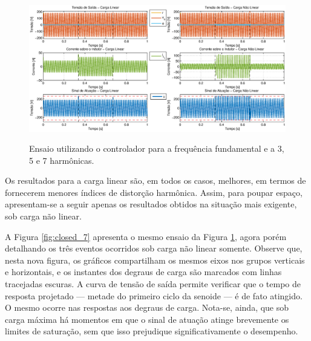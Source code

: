 \documentclass[repeatfields,oneside]{tcc}
\begin{document}
\begin{figure}[h]
    \centering
    \caption{Ensaio utilizando o controlador para a frequência fundamental e a 3{\textordfeminine}, 5{\textordfeminine} e 7{\textordfeminine} harmônicas.}
    \includegraphics[trim={80 20 80 20}, clip, width=\linewidth]{fig/closed_7_full.eps}
    \\
    \label{fig:closed_7_full}
\end{figure}

Os resultados para a carga linear são, em todos os casos, melhores, em termos de fornecerem menores índices de distorção harmônica.
Assim, para poupar espaço, apresentam-se a seguir apenas os resultados obtidos na situação mais exigente, sob carga não linear.

A Figura \ref{fig:closed_7} apresenta o mesmo ensaio da Figura \ref{fig:closed_7_full}, agora porém detalhando os três eventos ocorridos sob carga não linear somente.
Observe que, nesta nova figura, os gráficos compartilham os mesmos eixos nos grupos verticais e horizontais, e os instantes dos degraus de carga são marcados com linhas tracejadas escuras.
A curva de tensão de saída permite verificar que o tempo de resposta projetado --- metade do primeiro ciclo da senoide --- é de fato atingido.
O mesmo ocorre nas respostas aos degraus de carga.
Nota-se, ainda, que sob carga máxima há momentos em que o sinal de atuação atinge brevemente os limites de saturação, sem que isso prejudique significativamente o desempenho.
\end{document}

